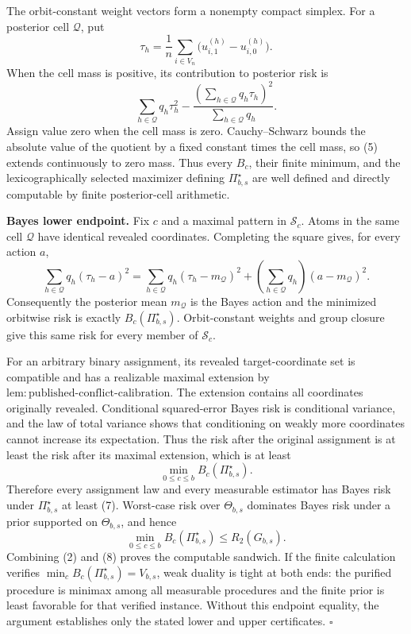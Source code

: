 The orbit-constant weight vectors form a nonempty compact simplex. For a posterior cell \(\mathcal Q\), put
\[
\tau_h=\frac1n\sum_{i\in V_n}\bigl(u^{(h)}_{i,1}-u^{(h)}_{i,0}\bigr).
\]
When the cell mass is positive, its contribution to posterior risk is
\[
\sum_{h\in\mathcal Q}q_h\tau_h^2
-\frac{\left(\sum_{h\in\mathcal Q}q_h\tau_h\right)^2}
{\sum_{h\in\mathcal Q}q_h}.
\tag{5}
\]
Assign value zero when the cell mass is zero. Cauchy--Schwarz bounds the absolute value of the quotient by a fixed constant times the cell mass, so (5) extends continuously to zero mass. Thus every \(B_c\), their finite minimum, and the lexicographically selected maximizer defining \(\Pi_{b,s}^{\star}\) are well defined and directly computable by finite posterior-cell arithmetic.

\textbf{Bayes lower endpoint.}
Fix \(c\) and a maximal pattern in \(\mathcal S_c\). Atoms in the same cell \(\mathcal Q\) have identical revealed coordinates. Completing the square gives, for every action \(a\),
\[
\sum_{h\in\mathcal Q}q_h(\tau_h-a)^2
=\sum_{h\in\mathcal Q}q_h(\tau_h-m_{\mathcal Q})^2
+\left(\sum_{h\in\mathcal Q}q_h\right)(a-m_{\mathcal Q})^2.
\tag{6}
\]
Consequently the posterior mean \(m_{\mathcal Q}\) is the Bayes action and the minimized orbitwise risk is exactly \(B_c(\Pi_{b,s}^{\star})\). Orbit-constant weights and group closure give this same risk for every member of \(\mathcal S_c\).

For an arbitrary binary assignment, its revealed target-coordinate set is compatible and has a realizable maximal extension by \(\mathrm{lem{:}published\text{-}conflict\text{-}calibration}\). The extension contains all coordinates originally revealed. Conditional squared-error Bayes risk is conditional variance, and the law of total variance shows that conditioning on weakly more coordinates cannot increase its expectation. Thus the risk after the original assignment is at least the risk after its maximal extension, which is at least
\[
\min_{0\leq c\leq b}B_c(\Pi_{b,s}^{\star}).
\tag{7}
\]
Therefore every assignment law and every measurable estimator has Bayes risk under \(\Pi_{b,s}^{\star}\) at least (7). Worst-case risk over \(\Theta_{b,s}\) dominates Bayes risk under a prior supported on \(\Theta_{b,s}\), and hence
\[
\min_{0\leq c\leq b}B_c(\Pi_{b,s}^{\star})
\leq R_2(G_{b,s}).
\tag{8}
\]
Combining (2) and (8) proves the computable sandwich. If the finite calculation verifies \(\min_cB_c(\Pi_{b,s}^{\star})=V_{b,s}\), weak duality is tight at both ends: the purified procedure is minimax among all measurable procedures and the finite prior is least favorable for that verified instance. Without this endpoint equality, the argument establishes only the stated lower and upper certificates. \(\square\)